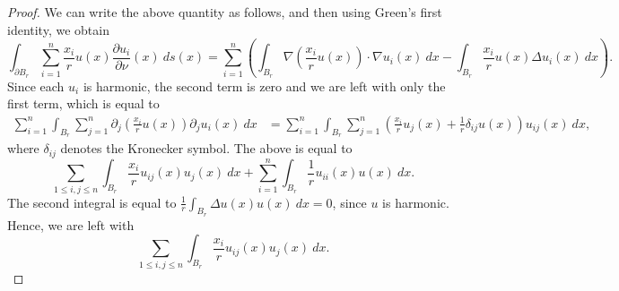 \documentclass[10pt]{amsart}
\theoremstyle{thmstyle}
\theoremstyle{defstyle}
\renewcommand{\le}{\leqslant}
\begin{document}
\begin{proof}
We can write the above quantity as follows, and then using Green's first identity, we obtain
\begin{equation*}
    \int_{\partial B_r}\sum_{i = 1}^n \frac{x_i}{r}u(x)\frac{\partial u_i}{\partial\nu}(x)~ds(x) = \sum_{i = 1}^n \left(\int_{B_r}\nabla\left(\frac{x_i}{r}u(x)\right)\cdot\nabla u_i(x)~dx - \int_{B_r}\frac{x_i}{r}u(x)\Delta u_i(x)~dx\right).
\end{equation*}
Since each $u_i$ is harmonic, the second term is zero and we are left with only the first term, which is equal to 
\begin{align*}
    \sum_{i = 1}^n \int_{B_r}\sum_{j = 1}^n \partial_j\left(\frac{x_i}{r}u(x)\right)\partial_j u_i(x)~dx &= \sum_{i = 1}^n \int_{B_r}\sum_{j = 1}^n\left(\frac{x_i}{r}u_j(x) + \frac{1}{r}\delta_{ij}u(x)\right)u_{ij}(x)~dx,
\end{align*}
where $\delta_{ij}$ denotes the Kronecker symbol. The above is equal to 
\begin{equation*}
    \sum_{1\le i,j\le n}\int_{B_r}\frac{x_i}{r} u_{ij}(x)u_j(x)~dx + \sum_{i = 1}^n \int_{B_r}\frac{1}{r}u_{ii}(x)u(x)~dx.
\end{equation*}
The second integral is equal to $\frac{1}{r}\int_{B_r}\Delta u(x)u(x)~dx = 0$, since $u$ is harmonic. Hence, we are left with 
\begin{equation}
    \sum_{1\le i,j\le n}\int_{B_r}\frac{x_i}{r}u_{ij}(x)u_j(x)~dx.\tag{$\clubsuit$}\label{intermediate-conclusion}
\end{equation}


\end{proof}
\end{document}
